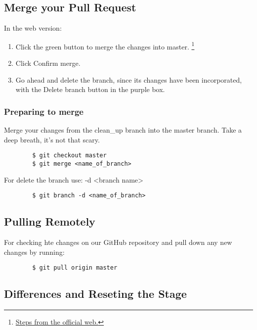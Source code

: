 \documentclass[12pt]{article}
\begin{document}
	\subsection{Merge your Pull Request}

		In the web version: 

		\begin{enumerate} 
		\item Click the green button to merge the changes into master. \footnote{\href{https://guides.github.com/activities/hello-world/}{Steps from the official web.}}
		\item Click Confirm merge.
		\item Go ahead and delete the branch, since its changes have been incorporated, with the Delete branch button in the purple box.
		\end{enumerate}

		\subsubsection{Preparing to merge}

		Merge your changes from the clean_up branch into the master branch. Take a deep breath, it's not that scary.

		\begin{verbatim}
		$ git checkout master
		$ git merge <name_of_branch>
		\end{verbatim}

		For delete the branch use: -d <branch name> 

		\begin{verbatim}
		$ git branch -d <name_of_branch>
		\end{verbatim}
		


	\subsection{Pulling Remotely}


		For checking hte changes on our GitHub repository and pull down any new changes by running: 


		\begin{verbatim}
		$ git pull origin master
		\end{verbatim}


	\subsection{Differences and Reseting the Stage}
\end{document}
